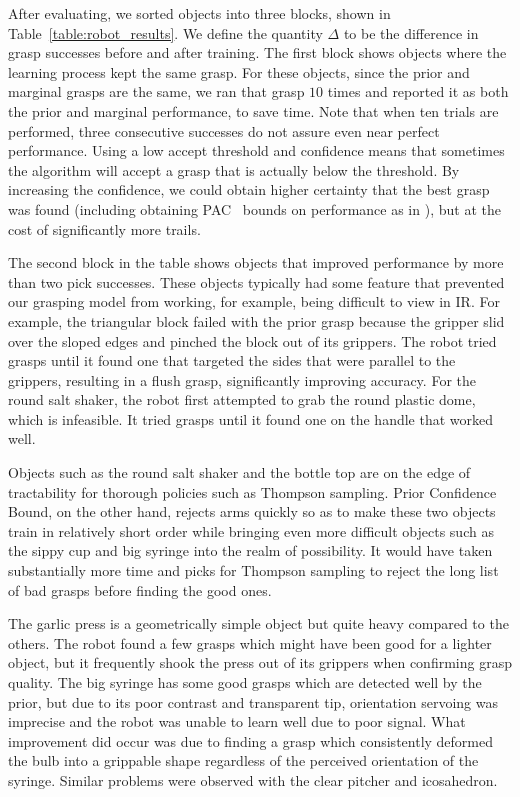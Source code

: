 \documentclass{article}
\newcommand{\algorithmDTxt}{Prior Confidence Bound\xspace}
\begin{document}
After evaluating, we sorted objects into three blocks, shown in
Table~\ref{table:robot_results}.  We define the quantity $\Delta$ to
be the difference in grasp successes before and after training.  The
first block shows objects where the learning process kept the same
grasp.  For these objects, since the prior and marginal grasps are the
same, we ran that grasp $10$ times and reported it as both the prior
and marginal performance, to save time.  Note that when ten trials are
performed, three consecutive successes do not assure even near perfect
performance.  Using a low accept threshold and confidence means that
sometimes the algorithm will accept a grasp that is actually below the
threshold.  By increasing the confidence, we could obtain higher
certainty that the best grasp was found (including obtaining
PAC~\citep{valiant84} bounds on performance as in \citet{maron93}),
but at the cost of significantly more trails.

The second block in the table shows objects that improved performance
by more than two pick successes.  These objects typically had some
feature that prevented our grasping model from working, for example,
being difficult to view in IR.  For example, the triangular block
failed with the prior grasp because the gripper slid over the sloped
edges and pinched the block out of its grippers.  The robot tried
grasps until it found one that targeted the sides that were parallel
to the grippers, resulting in a flush grasp, significantly improving
accuracy.  For the round salt shaker, the robot first attempted to
grab the round plastic dome, which is infeasible. It tried grasps
until it found one on the handle that worked well.


Objects such as the round salt shaker and the bottle top are on the
edge of tractability for thorough policies such as Thompson
sampling. \algorithmDTxt, on the other hand, rejects arms quickly so
as to make these two objects train in relatively short order while
bringing even more difficult objects such as the sippy cup and big
syringe into the realm of possibility. It would have taken
substantially more time and picks for Thompson sampling to reject the
long list of bad grasps before finding the good ones.

The garlic press is a geometrically simple object but quite heavy
compared to the others. The robot found a few grasps which might have
been good for a lighter object, but it frequently shook the press out
of its grippers when confirming grasp quality.  The big syringe has
some good grasps which are detected well by the prior, but due to its
poor contrast and transparent tip, orientation servoing was imprecise
and the robot was unable to learn well due to poor signal. What
improvement did occur was due to finding a grasp which consistently
deformed the bulb into a grippable shape regardless of the perceived
orientation of the syringe. Similar problems were observed with the
clear pitcher and icosahedron.
\end{document}
